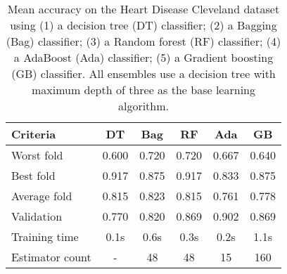 \begin{table}[htbp]
    \centering
    \label{tab:hdc_table}
    \begin{tabular}{l c c c c c}
    \toprule
    Criteria        & DT    & Bag       & RF    & Ada   & GB \\
    \midrule
    Worst fold      & 0.600 & 0.720     & 0.720 & 0.667 & 0.640\\
    Best fold       & 0.917 & 0.875     & 0.917 & 0.833 & 0.875\\
    Average fold    & 0.815 & 0.823     & 0.815 & 0.761 & 0.778\\
    Validation      & 0.770 & 0.820     & 0.869 & 0.902 & 0.869\\
    Training time   & 0.1s  & 0.6s      & 0.3s  & 0.2s  & 1.1s\\
    Estimator count & -     & 48        & 48    & 15    & 160\\
    \bottomrule
    \end{tabular}
    \caption{
        Mean accuracy on the Heart Disease Cleveland dataset using 
        (1) a decision tree (DT) classifier;
        (2) a Bagging (Bag) classifier;
        (3) a Random forest (RF) classifier; 
        (4) a AdaBoost (Ada) classifier; 
        (5) a Gradient boosting (GB) classifier.
        All ensembles use a decision tree with maximum depth of three as 
        the base learning algorithm.
    }
\end{table}